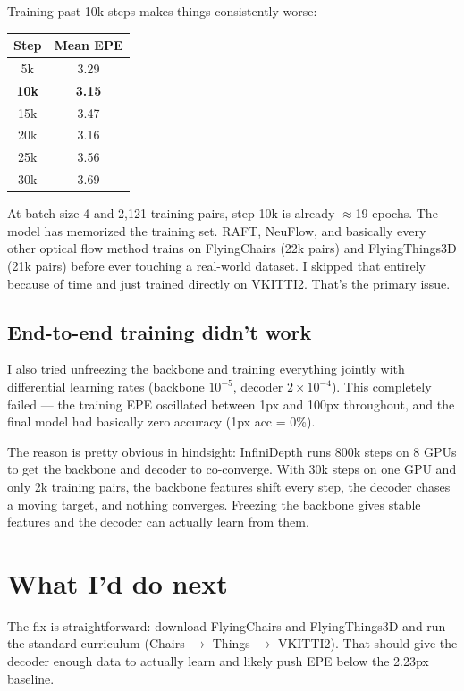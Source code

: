 \documentclass[11pt,a4paper]{article}
\begin{document}
Training past 10k steps makes things consistently worse:

\begin{center}
\begin{tabular}{cc}
\toprule Step & Mean EPE \\ \midrule
5k & 3.29 \\ \textbf{10k} & \textbf{3.15} \\ 15k & 3.47 \\ 20k & 3.16 \\ 25k & 3.56 \\ 30k & 3.69 \\
\bottomrule
\end{tabular}
\end{center}

At batch size 4 and 2,121 training pairs, step 10k is already $\approx$19 epochs. The model has memorized the training set. RAFT, NeuFlow, and basically every other optical flow method trains on FlyingChairs (22k pairs) and FlyingThings3D (21k pairs) before ever touching a real-world dataset. I skipped that entirely because of time and just trained directly on VKITTI2. That's the primary issue.

\subsection{End-to-end training didn't work}

I also tried unfreezing the backbone and training everything jointly with differential learning rates (backbone $10^{-5}$, decoder $2\times10^{-4}$). This completely failed --- the training EPE oscillated between 1px and 100px throughout, and the final model had basically zero accuracy (1px acc = 0\%). 

The reason is pretty obvious in hindsight: InfiniDepth runs 800k steps on 8 GPUs to get the backbone and decoder to co-converge. With 30k steps on one GPU and only 2k training pairs, the backbone features shift every step, the decoder chases a moving target, and nothing converges. Freezing the backbone gives stable features and the decoder can actually learn from them.

\section{What I'd do next}

The fix is straightforward: download FlyingChairs and FlyingThings3D and run the standard curriculum (Chairs $\to$ Things $\to$ VKITTI2). That should give the decoder enough data to actually learn and likely push EPE below the 2.23px baseline.
\end{document}
